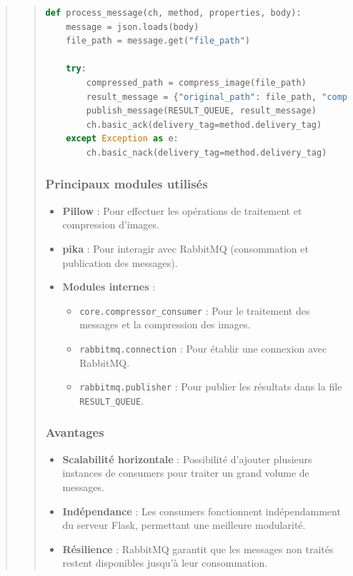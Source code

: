 \documentclass[12pt]{article}
\begin{document}
\begin{quote}
\begin{quote}
\begin{lstlisting}[language=Python]
def process_message(ch, method, properties, body):
    message = json.loads(body)
    file_path = message.get("file_path")

    try:
        compressed_path = compress_image(file_path)
        result_message = {"original_path": file_path, "compressed_path": compressed_path}
        publish_message(RESULT_QUEUE, result_message)
        ch.basic_ack(delivery_tag=method.delivery_tag)
    except Exception as e:
        ch.basic_nack(delivery_tag=method.delivery_tag)
\end{lstlisting}

\subsubsection*{Principaux modules utilisés}
\begin{itemize}
    \item \textbf{Pillow} : Pour effectuer les opérations de traitement et compression d'images.
    \item \textbf{pika} : Pour interagir avec RabbitMQ (consommation et publication des messages).
    \item \textbf{Modules internes} :
    \begin{itemize}
        \item \texttt{core.compressor\_consumer} : Pour le traitement des messages et la compression des images.
        \item \texttt{rabbitmq.connection} : Pour établir une connexion avec RabbitMQ.
        \item \texttt{rabbitmq.publisher} : Pour publier les résultats dans la file \texttt{RESULT\_QUEUE}.
    \end{itemize}
\end{itemize}

\subsubsection*{Avantages}
\begin{itemize}
    \item \textbf{Scalabilité horizontale} : Possibilité d'ajouter plusieurs instances de consumers pour traiter un grand volume de messages.
    \item \textbf{Indépendance} : Les consumers fonctionnent indépendamment du serveur Flask, permettant une meilleure modularité.
    \item \textbf{Résilience} : RabbitMQ garantit que les messages non traités restent disponibles jusqu'à leur consommation.
\end{itemize}


\end{quote}
\end{quote}
\end{document}
